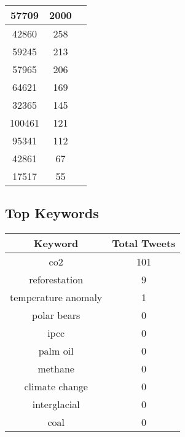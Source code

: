 \documentclass{article}\usepackage[T1]{fontenc}
\begin{document}
\begin{tabular}{|c|c|c|}
 \hline
57709 & 2000\\ 
 \hline
42860 & 258\\ 
 \hline
59245 & 213\\ 
 \hline
57965 & 206\\ 
 \hline
64621 & 169\\ 
 \hline
32365 & 145\\ 
 \hline
100461 & 121\\ 
 \hline
95341 & 112\\ 
 \hline
42861 & 67\\ 
 \hline
17517 & 55\\ 
 \hline
\end{tabular}\subsection*{Top Keywords}\begin{tabular}{|c|c|}         \hline         Keyword & Total Tweets \\ 
 \hline
co2 & 101\\ 
 \hline
reforestation & 9\\ 
 \hline
temperature anomaly & 1\\ 
 \hline
polar bears & 0\\ 
 \hline
ipcc & 0\\ 
 \hline
palm oil & 0\\ 
 \hline
methane & 0\\ 
 \hline
climate change & 0\\ 
 \hline
interglacial & 0\\ 
 \hline
coal & 0\\ 
 \hline
\end{tabular}
\end{document}
